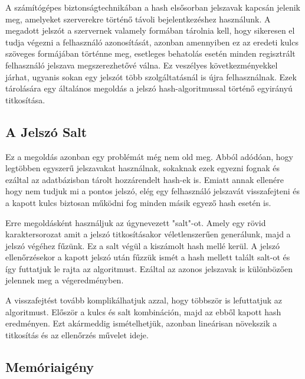 A számítógépes biztonságtechnikában a hash elsősorban jelszavak kapcsán jelenik meg, amelyeket szerverekre történő távoli bejelentkezéshez használunk. A megadott jelszót a szervernek valamely formában tárolnia kell, hogy sikeresen el tudja végezni a felhasználó azonosítását, azonban amennyiben ez az eredeti kulcs szöveges formájában történne meg, esetleges behatolás esetén minden regisztrált felhasználó jelszava megszerezhetővé válna. Ez veszélyes következményekkel járhat, ugyanis sokan egy jelszót több szolgáltatásnál is újra felhasználnak. Ezek tárolására egy általános megoldás a jelszó hash-algoritmussal történő egyirányú titkosítása.


\subsection{A Jelszó Salt}

Ez a megoldás azonban egy problémát még nem old meg. Abból adódóan, hogy legtöbben egyszerű jelszavakat használnak, sokaknak ezek egyezni fognak és ezáltal az adatbázisban tárolt hozzárendelt hash-ek is. Emiatt annak ellenére hogy nem tudjuk mi a pontos jelszó, elég egy felhasználó jelszavát visszafejteni és a kapott kulcs biztosan működni fog minden másik egyező hash esetén is.

Erre megoldásként használjuk az úgynevezett "salt"-ot. Amely egy rövid karaktersorozat amit a jelszó titkosításakor véletlenszerűen generálunk, majd a jelszó végéhez fűzünk. Ez a salt végül a kiszámolt hash mellé kerül. A jelszó ellenőrzésekor a kapott jelszó után fűzzük ismét a hash mellett talált salt-ot és így futtatjuk le rajta az algoritmust. Ezáltal az azonos jelszavak is különbözően jelennek meg a végeredményben.

A visszafejtést tovább komplikálhatjuk azzal, hogy többször is lefuttatjuk az algoritmust. Először a kulcs és salt kombináción, majd az ebből kapott hash eredményen. Ezt akármeddig ismételhetjük, azonban lineárisan növekszik a titkosítás és az ellenőrzés művelet ideje.

\subsection{Memóriaigény}


